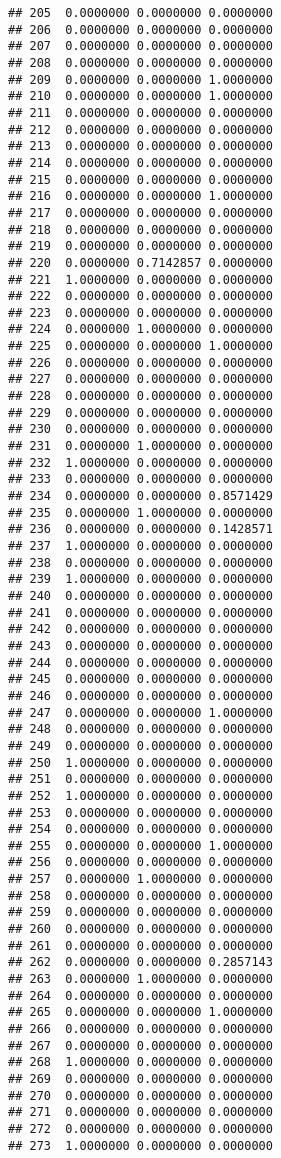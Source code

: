 \documentclass[
]{article}
\begin{document}
\begin{verbatim}
## 205  0.0000000 0.0000000 0.0000000
## 206  0.0000000 0.0000000 0.0000000
## 207  0.0000000 0.0000000 0.0000000
## 208  0.0000000 0.0000000 0.0000000
## 209  0.0000000 0.0000000 1.0000000
## 210  0.0000000 0.0000000 1.0000000
## 211  0.0000000 0.0000000 0.0000000
## 212  0.0000000 0.0000000 0.0000000
## 213  0.0000000 0.0000000 0.0000000
## 214  0.0000000 0.0000000 0.0000000
## 215  0.0000000 0.0000000 0.0000000
## 216  0.0000000 0.0000000 1.0000000
## 217  0.0000000 0.0000000 0.0000000
## 218  0.0000000 0.0000000 0.0000000
## 219  0.0000000 0.0000000 0.0000000
## 220  0.0000000 0.7142857 0.0000000
## 221  1.0000000 0.0000000 0.0000000
## 222  0.0000000 0.0000000 0.0000000
## 223  0.0000000 0.0000000 0.0000000
## 224  0.0000000 1.0000000 0.0000000
## 225  0.0000000 0.0000000 1.0000000
## 226  0.0000000 0.0000000 0.0000000
## 227  0.0000000 0.0000000 0.0000000
## 228  0.0000000 0.0000000 0.0000000
## 229  0.0000000 0.0000000 0.0000000
## 230  0.0000000 0.0000000 0.0000000
## 231  0.0000000 1.0000000 0.0000000
## 232  1.0000000 0.0000000 0.0000000
## 233  0.0000000 0.0000000 0.0000000
## 234  0.0000000 0.0000000 0.8571429
## 235  0.0000000 1.0000000 0.0000000
## 236  0.0000000 0.0000000 0.1428571
## 237  1.0000000 0.0000000 0.0000000
## 238  0.0000000 0.0000000 0.0000000
## 239  1.0000000 0.0000000 0.0000000
## 240  0.0000000 0.0000000 0.0000000
## 241  0.0000000 0.0000000 0.0000000
## 242  0.0000000 0.0000000 0.0000000
## 243  0.0000000 0.0000000 0.0000000
## 244  0.0000000 0.0000000 0.0000000
## 245  0.0000000 0.0000000 0.0000000
## 246  0.0000000 0.0000000 0.0000000
## 247  0.0000000 0.0000000 1.0000000
## 248  0.0000000 0.0000000 0.0000000
## 249  0.0000000 0.0000000 0.0000000
## 250  1.0000000 0.0000000 0.0000000
## 251  0.0000000 0.0000000 0.0000000
## 252  1.0000000 0.0000000 0.0000000
## 253  0.0000000 0.0000000 0.0000000
## 254  0.0000000 0.0000000 0.0000000
## 255  0.0000000 0.0000000 1.0000000
## 256  0.0000000 0.0000000 0.0000000
## 257  0.0000000 1.0000000 0.0000000
## 258  0.0000000 0.0000000 0.0000000
## 259  0.0000000 0.0000000 0.0000000
## 260  0.0000000 0.0000000 0.0000000
## 261  0.0000000 0.0000000 0.0000000
## 262  0.0000000 0.0000000 0.2857143
## 263  0.0000000 1.0000000 0.0000000
## 264  0.0000000 0.0000000 0.0000000
## 265  0.0000000 0.0000000 1.0000000
## 266  0.0000000 0.0000000 0.0000000
## 267  0.0000000 0.0000000 0.0000000
## 268  1.0000000 0.0000000 0.0000000
## 269  0.0000000 0.0000000 0.0000000
## 270  0.0000000 0.0000000 0.0000000
## 271  0.0000000 0.0000000 0.0000000
## 272  0.0000000 0.0000000 0.0000000
## 273  1.0000000 0.0000000 0.0000000

\end{verbatim}
\end{document}
